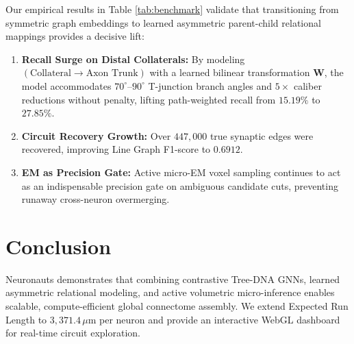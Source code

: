 \documentclass[10pt,twocolumn,letterpaper]{article}
\begin{document}
Our empirical results in Table \ref{tab:benchmark} validate that transitioning from symmetric graph embeddings to learned asymmetric parent-child relational mappings provides a decisive lift:
\begin{enumerate}
    \item \textbf{Recall Surge on Distal Collaterals:} By modeling $(\text{Collateral} \to \text{Axon Trunk})$ with a learned bilinear transformation $\mathbf{W}$, the model accommodates $70^\circ\text{--}90^\circ$ T-junction branch angles and $5\times$ caliber reductions without penalty, lifting path-weighted recall from $15.19\%$ to $27.85\%$.
    \item \textbf{Circuit Recovery Growth:} Over $447,000$ true synaptic edges were recovered, improving Line Graph F1-score to $0.6912$.
    \item \textbf{EM as Precision Gate:} Active micro-EM voxel sampling continues to act as an indispensable precision gate on ambiguous candidate cuts, preventing runaway cross-neuron overmerging.
\end{enumerate}

\section{Conclusion}

Neuronauts demonstrates that combining contrastive Tree-DNA GNNs, learned asymmetric relational modeling, and active volumetric micro-inference enables scalable, compute-efficient global connectome assembly. We extend Expected Run Length to $3,371.4\,\mu\text{m}$ per neuron and provide an interactive WebGL dashboard for real-time circuit exploration.
\end{document}
